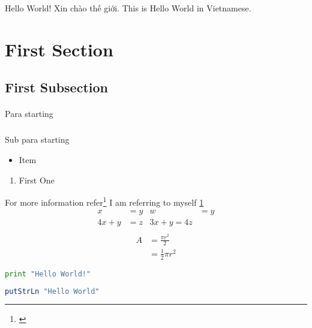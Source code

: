 \documentclass[a4paper]{article}
\begin{document}
Hello World!
Xin chào thế giới. This is Hello World in Vietnamese.
\tableofcontents
    \section{First Section}
    \subsection{First Subsection}
    \paragraph{}
    Para starting
    \subparagraph{}
    Sub para starting
    \begin{itemize}
    \item Item
    \end{itemize}
    \begin{enumerate}
    \item First One
    \end{enumerate}
    For more information refer\footnote{\label{myfootnote}}    
    I am referring to myself \ref{myfootnote}    
    \begin{align*}
      x&=y & w &= y \\
      4x +y &= z & 3x + y = 4z \\
    \end{align*}
    \begin{equation}
      \begin{split}
        A &= \frac{\pi r^2}{2}\\
          &= \frac{1}{2}\pi r^2
      \end{split}
    \end{equation}
\begin{lstlisting}[language=Python]
print "Hello World!"
\end{lstlisting}
\begin{lstlisting}[language=Haskell]
  putStrLn "Hello World"
\end{lstlisting}
\end{document}
